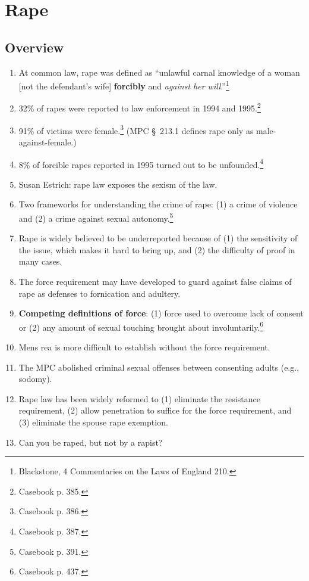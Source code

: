 \section{Rape}

\subsection{Overview}

\begin{enumerate}
    \item At common law, rape was defined as ``unlawful carnal knowledge of a 
    woman [not the defendant's wife] \textbf{forcibly} and \emph{against her 
    will}.''\footnote{Blackstone, 4 Commentaries on the Laws of England 210.}
    \item 32\% of rapes were reported to law enforcement in 1994 and 
    1995.\footnote{Casebook p. 385.}
    \item 91\% of victims were female.\footnote{Casebook p. 386.} (MPC \S\ 213.1 
    defines rape only as male-against-female.)
    \item 8\% of forcible rapes reported in 1995 turned out to be 
    unfounded.\footnote{Casebook p. 387.}
    \item Susan Estrich: rape law exposes the sexism of the law.
    \item Two frameworks for understanding the crime of rape: (1) a crime of 
    violence and (2) a crime against sexual autonomy.\footnote{Casebook p. 
    391.}
    \item Rape is widely believed to be underreported because of (1) the 
    sensitivity of the issue, which makes it hard to bring up, and (2) the 
    difficulty of proof in many cases.
    \item The force requirement may have developed to guard against false 
    claims of rape as defenses to fornication and adultery.
    \item \textbf{Competing definitions of force}: (1) force used to overcome 
    lack of consent or (2) any amount of sexual touching brought about 
    involuntarily.\footnote{Casebook p. 437.}
    \item Mens rea is more difficult to establish without the force 
    requirement.
    \item The MPC abolished criminal sexual offenses between consenting adults 
    (e.g., sodomy).
    \item Rape law has been widely reformed to (1) eliminate the resistance 
    requirement, (2) allow penetration to suffice for the force requirement, 
    and (3) eliminate the spouse rape exemption.
    \item Can you be raped, but not by a rapist?
\end{enumerate}

